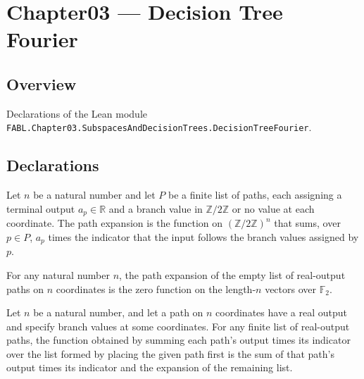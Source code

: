 \chapter{Chapter03 — Decision Tree Fourier}
\section{Overview}

Declarations of the Lean module \texttt{FABL.Chapter03.SubspacesAndDecisionTrees.DecisionTreeFourier}.

\section{Declarations}

\begin{definition}
\leanok
{}
Let $n$ be a natural number and let $P$ be a finite list of paths, each assigning a
terminal output $a_p\in\mathbb{R}$ and a branch value in $\mathbb{Z}/2\mathbb{Z}$ or no
value at each coordinate. The path expansion is the function on
$(\mathbb{Z}/2\mathbb{Z})^n$ that sums, over $p\in P$, $a_p$ times the indicator that
the input follows the branch values assigned by $p$.
\end{definition}

\begin{theorem}
\leanok
{}
For any natural number $n$, the path expansion of the empty list of real-output paths on
$n$ coordinates is the zero function on the length-$n$ vectors over $\mathbb F_2$.
\end{theorem}

\begin{theorem}
\leanok
{}
Let $n$ be a natural number, and let a path on $n$ coordinates have a real output and
specify branch values at some coordinates. For any finite list of real-output paths, the
function obtained by summing each path's output times its indicator over the list formed
by placing the given path first is the sum of that path's output times its indicator and
the expansion of the remaining list.
\end{theorem}

